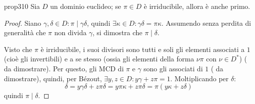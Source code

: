 \documentclass[11pt, a4paper]{scrartcl}
\theoremstyle{definition}
\numberwithin{esempio}{section}
\theoremstyle{definition}
\numberwithin{obs}{section}
\numberwithin{nota}{section}
\numberwithin{equation}{subsection}
\begin{document}
\begin{prop}
	{}{prop310}
	Sia $D$ un dominio euclideo; se $\pi \in D$ \`e irriducibile, allora \`e anche primo.
	\begin{proof}
		Siano $\gamma, \delta  \in D : \pi  \mid \gamma \delta $, quindi $\exists \kappa \in D : \gamma \delta  = \pi \kappa $.
		Assumendo senza perdita di generalit\`a che $\pi$ non divida $\gamma$, si dimostra che $\pi  \mid \delta $.

		Visto che $\pi$ \`e irriducibile, i suoi divisori sono tutti e soli gli elementi associati a $1$ (cio\`e gli invertibili) e a se stesso (ossia gli elementi della forma $\nu  \pi $ con $\nu \in D^*$) ({\color{red} da dimostrare}).
		Per questo, gli MCD di $\pi$ e $\gamma$ sono gli associati di $1$ ({\color{red} da dimostrare}), quindi, per B\'ezout, $\exists y,z \in D : y \gamma + z \pi = 1$.
		Moltiplicando per $\delta $:
		\[
		\delta  = y \gamma\delta + z \pi \delta  = y \pi \kappa  + z \pi \delta  = \pi(y\kappa +z\delta )
		\] 
		quindi $\pi \mid \delta $.
	\end{proof}
\end{prop}
\end{document}
